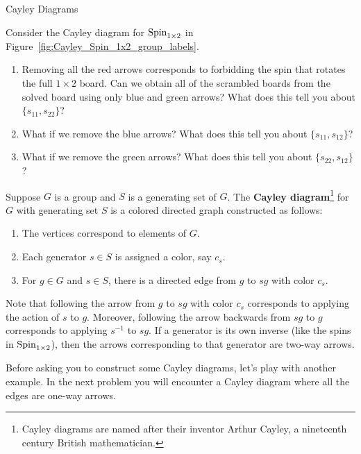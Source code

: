 \begin{section}{Cayley Diagrams}
\begin{problem}\label{cayley:altSpin1x2}
Consider the Cayley diagram for $\operatorname{Spin}_{1\times 2}$ in Figure~\ref{fig:Cayley_Spin_1x2_group_labels}.
\begin{enumerate}[label=\textrm{(\alph*)}]
\item Removing all the red arrows corresponds to forbidding the spin that rotates the full $1\times 2$ board. Can we obtain all of the scrambled boards from the solved board using only blue and green arrows? What does this tell you about $\{s_{11},s_{22}\}$?
\item What if we remove the blue arrows? What does this tell you about $\{s_{11},s_{12}\}$?
\item What if we remove the green arrows? What does this tell you about $\{s_{22},s_{12}\}$?
\end{enumerate}
\end{problem}

\begin{definition}
Suppose $G$ is a group and $S$ is a generating set of $G$. The \textbf{Cayley diagram}\footnote{Cayley diagrams are named after their inventor Arthur Cayley, a nineteenth century British mathematician.} for $G$ with generating set $S$ is a colored directed graph constructed as follows:
\begin{enumerate}[label=\textrm{(\alph*)}]
\item The vertices correspond to elements of $G$.
\item Each generator $s\in S$ is assigned a color, say $c_s$.
\item For $g\in G$ and $s\in S$, there is a directed edge from $g$ to $sg$ with color $c_s$.
\end{enumerate}
\end{definition}

Note that following the arrow from $g$ to $sg$ with color $c_s$ corresponds to applying the action of $s$ to $g$. Moreover, following the arrow backwards from $sg$ to $g$ corresponds to applying $s^{-1}$ to $sg$. If a generator is its own inverse (like the spins in $\operatorname{Spin}_{1\times 2}$), then the arrows corresponding to that generator are two-way arrows.   

Before asking you to construct some Cayley diagrams, let's play with another example. In the next problem you will encounter a Cayley diagram where all the edges are one-way arrows.


\end{section}
